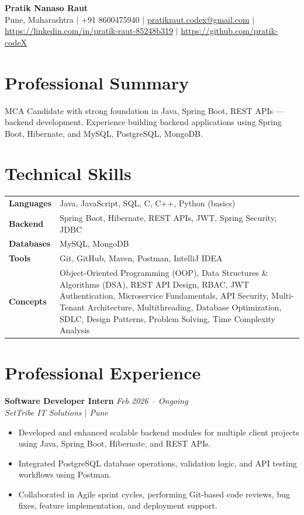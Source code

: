 \documentclass[10.5pt,a4paper]{article}
\begin{document}
\begin{center}
{\Large\bfseries Pratik Nanaso Raut}\\[2pt]
Pune, Maharashtra $|$ +91 8600475940 $|$ \href{mailto:pratikraut.codex@gmail.com}{pratikraut.codex@gmail.com} $|$ \href{https://linkedin.com/in/pratik-raut-85248b319}{https://linkedin.com/in/pratik-raut-85248b319} $|$ \href{https://github.com/pratik-codeX}{https://github.com/pratik-codeX}
\end{center}
\vspace{-2pt}
\section{Professional Summary}
MCA Candidate with strong foundation in Java, Spring Boot, REST APIs — backend development. Experience building backend applications using Spring Boot, Hibernate, and MySQL, PostgreSQL, MongoDB.
\section{Technical Skills}
\begin{tabular}{@{}p{}p{}@{}}
\textbf{Languages} & Java, JavaScript, SQL, C, C++, Python (basics) \\[1pt]
\textbf{Backend} & Spring Boot, Hibernate, REST APIs, JWT, Spring Security, JDBC \\[1pt]
\textbf{Databases} & MySQL, MongoDB \\[1pt]
\textbf{Tools} & Git, GitHub, Maven, Postman, IntelliJ IDEA \\[1pt]
\textbf{Concepts} & Object-Oriented Programming (OOP), Data Structures \& Algorithms (DSA), REST API Design, RBAC, JWT Authentication, Microservice Fundamentals, API Security, Multi-Tenant Architecture, Multithreading, Database Optimization, SDLC, Design Patterns, Problem Solving, Time Complexity Analysis \\
\end{tabular}
\section{Professional Experience}
\textbf{Software Developer Intern} \hfill \textit{Feb 2026 -- Ongoing}
\\\textit{SetTribe IT Solutions $|$ Pune}
\begin{itemize}
  \item Developed and enhanced scalable backend modules for multiple client projects using Java, Spring Boot, Hibernate, and REST APIs.
  \item Integrated PostgreSQL database operations, validation logic, and API testing workflows using Postman.
  \item Collaborated in Agile sprint cycles, performing Git-based code reviews, bug fixes, feature implementation, and deployment support.
\end{itemize}
\end{document}
